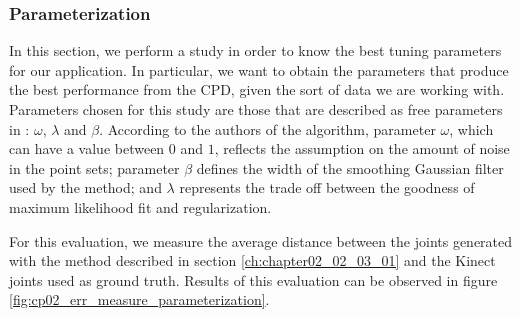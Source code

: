 \subsubsection{Parameterization}\label{ch:chapter02_02_03_02}

In this section, we perform a study in order to know the best tuning parameters for our application. In particular, we 
want to obtain the parameters that produce the best performance from the CPD, given the sort of data we are working 
with. Parameters chosen for this study are those that are described as free parameters in \cite{myronenko2010point}: 
$\omega$, $\lambda$ and $\beta$. According to the authors of the algorithm, parameter $\omega$, which can have a value 
between $0$ and $1$, reflects the assumption on the amount of noise in the point sets; parameter $\beta$ defines the 
width of the smoothing Gaussian filter used by the method; and $\lambda$ represents the trade off between the goodness 
of maximum likelihood fit and regularization.

For this evaluation, we measure the average distance between the joints generated with the method described in section \ref{ch:chapter02_02_03_01} and the Kinect joints used as ground truth. Results of this evaluation can be observed in figure \ref{fig:cp02_err_measure_parameterization}.

